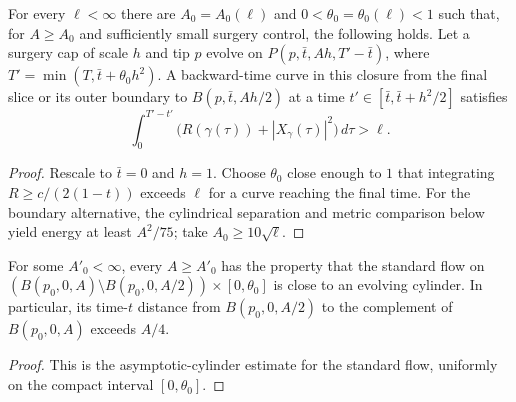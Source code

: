 \begin{proposition}
\label{prop:long-L-length-near-surgery-cap}
\label{bigell}
For every $\ell<\infty$ there are $A_0=A_0(\ell)$ and $0<\theta_0=\theta_0(\ell)<1$ such that, for $A\geq A_0$ and sufficiently small surgery control, the following holds. Let a surgery cap of scale $h$ and tip $p$ evolve on $P(p,\bar t,Ah,T'-\bar t)$, where $T'=\min(T,\bar t+\theta_0h^2)$. A backward-time curve in this closure from the final slice or its outer boundary to $B(p,\bar t,Ah/2)$ at a time $t'\in[\bar t,\bar t+h^2/2]$ satisfies
\[
\int_0^{T'-t'}\bigl(R(\gamma(\tau))+|X_\gamma(\tau)|^2\bigr)\,d\tau>\ell.
\]
\end{proposition}
\label{*}\label{**}
\begin{proof}
\sketch
{}
Rescale to $\bar t=0$ and $h=1$. Choose $\theta_0$ close enough to $1$ that integrating $R\geq c/(2(1-t))$ exceeds $\ell$ for a curve reaching the final time. For the boundary alternative, the cylindrical separation and metric comparison below yield energy at least $A^2/75$; take $A_0\geq10\sqrt\ell$.
\end{proof}

\begin{claim}
\label{claim:standard-solution-neck-at-infinity}
For some $A'_0<\infty$, every $A\geq A'_0$ has the property that the standard flow on $(B(p_0,0,A)\setminus B(p_0,0,A/2))\times[0,\theta_0]$ is close to an evolving cylinder. In particular, its time-$t$ distance from $B(p_0,0,A/2)$ to the complement of $B(p_0,0,A)$ exceeds $A/4$.
\end{claim}
\begin{proof}
\sketch
{}
This is the asymptotic-cylinder estimate for the standard flow, uniformly on the compact interval $[0,\theta_0]$.
\end{proof}

